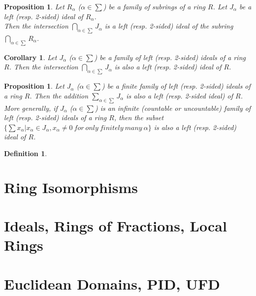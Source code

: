 \documentclass[a4paper,sfsidenotes,openany]{tufte-book}
\theoremstyle{theorem}
\newtheorem{corollary}[theorem]{Corollary}
\newtheorem{proposition}[theorem]{Proposition}
\newtheorem{definition}[theorem]{Definition}
\begin{document}
\begin{fullwidth}
\begin{proposition}
Let $R_\alpha$ ($\alpha \in \sum$) be a family of subrings of a ring $R$. Let $J_\alpha$ be a left (resp. 2-sided) ideal of $R_\alpha$.\\
Then the intersection $\bigcap\limits_{\alpha \in \sum}J_\alpha$ is a left (resp. 2-sided) ideal of the subring $\bigcap\limits_{\alpha \in \sum}R_\alpha$.\\
\end{proposition}
\>

\begin{corollary}
Let $J_\alpha$ ($\alpha \in \sum$) be a family of left (resp. 2-sided) ideals of a ring $R$. Then the intersection $\bigcap\limits_{\alpha \in \sum}J_\alpha$ is also a left (resp. 2-sided) ideal of $R$.\\
\end{corollary}
\>

\begin{proposition}
Let $J_\alpha$ ($\alpha \in \sum$) be a finite family of left (resp. 2-sided) ideals of a ring $R$. Then the addition $\sum_{\alpha \in \sum} J_\alpha$ is also a left (resp. 2-sided ideal) of $R$.\\
More generally, if $J_\alpha$ ($\alpha \in \sum$) is an infinite (countable or uncountable) family of left (resp. 2-sided) ideals of a ring $R$, then the subset $\{\sum x_\alpha | x_\alpha \in J_\alpha, x_\alpha \neq 0 \ for \ only \ finitely \ many \ \alpha\}$ is also a left (resp. 2-sided) ideal of $R$.\\
\end{proposition}
\>

\begin{definition}
	
\end{definition}
\>

\section{Ring Isomorphisms}

\section{Ideals, Rings of Fractions, Local Rings}

\section{Euclidean Domains, PID, UFD}

\end{fullwidth}
\end{document}

